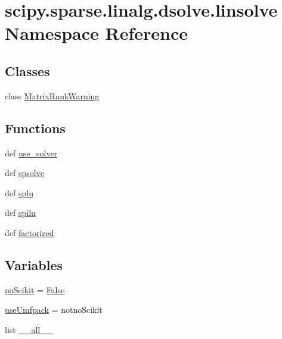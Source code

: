 \hypertarget{namespacescipy_1_1sparse_1_1linalg_1_1dsolve_1_1linsolve}{}\section{scipy.\+sparse.\+linalg.\+dsolve.\+linsolve Namespace Reference}
\label{namespacescipy_1_1sparse_1_1linalg_1_1dsolve_1_1linsolve}
\subsection*{Classes}
\begin{DoxyCompactItemize}
\item 
class \hyperlink{classscipy_1_1sparse_1_1linalg_1_1dsolve_1_1linsolve_1_1MatrixRankWarning}{Matrix\+Rank\+Warning}
\end{DoxyCompactItemize}
\subsection*{Functions}
\begin{DoxyCompactItemize}
\item 
def \hyperlink{namespacescipy_1_1sparse_1_1linalg_1_1dsolve_1_1linsolve_ab0fbba012966fdf0f6653f809f11eed7}{use\+\_\+solver}
\item 
def \hyperlink{namespacescipy_1_1sparse_1_1linalg_1_1dsolve_1_1linsolve_ab271164072e1d14d41d56c6341602e36}{spsolve}
\item 
def \hyperlink{namespacescipy_1_1sparse_1_1linalg_1_1dsolve_1_1linsolve_a621e8951f214ac2ee3d7e209bb99ecf8}{splu}
\item 
def \hyperlink{namespacescipy_1_1sparse_1_1linalg_1_1dsolve_1_1linsolve_aee9ea27aacfc71df807ebb3e3819a1e8}{spilu}
\item 
def \hyperlink{namespacescipy_1_1sparse_1_1linalg_1_1dsolve_1_1linsolve_ad89c412b2f2a0005a3c749e2f52170a4}{factorized}
\end{DoxyCompactItemize}
\subsection*{Variables}
\begin{DoxyCompactItemize}
\item 
\hyperlink{namespacescipy_1_1sparse_1_1linalg_1_1dsolve_1_1linsolve_a3e66e7103a2d574a3154c50c3ba8ea64}{no\+Scikit} = \hyperlink{libqhull_8h_a306ebd41c0cd1303b1372c6153f0caf8}{False}
\item 
\hyperlink{namespacescipy_1_1sparse_1_1linalg_1_1dsolve_1_1linsolve_a768b094cdd18f62c85c106b6f27d64d7}{use\+Umfpack} = notno\+Scikit
\item 
list \hyperlink{namespacescipy_1_1sparse_1_1linalg_1_1dsolve_1_1linsolve_a8f106dffa03bf33f853f5ae77a274c2d}{\+\_\+\+\_\+all\+\_\+\+\_\+}
\end{DoxyCompactItemize}


